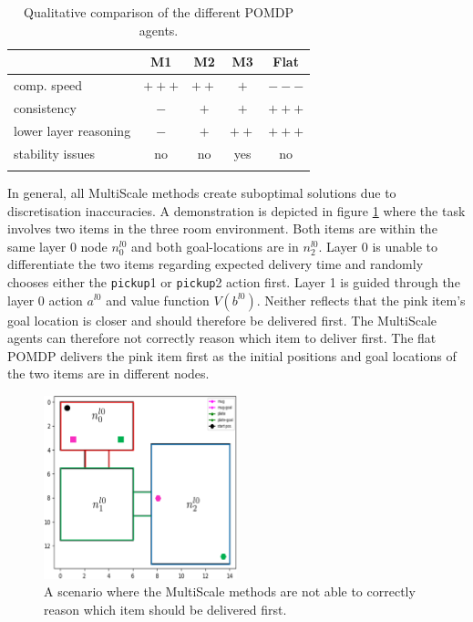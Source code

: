 \begin{table}[h!]
    \centering
    \begin{tabular}{l c c c c}
    \toprule
         &  M1 & M2 & M3 & Flat\\
    \midrule
        \addlinespace
         comp. speed & $+++$ & $++$ & $+$ & $---$ \\
         \addlinespace
         consistency & $-$ & $+$ & $+$ & $+++$ \\
         \addlinespace
         lower layer reasoning & $-$ & $+$ & $++$ & $+++$ \\
         \addlinespace
         stability issues & no & no& yes & no\\
         \addlinespace
    \bottomrule
    \end{tabular}
    \caption{Qualitative comparison of the different POMDP agents.}
    \label{tab:properties}
\end{table}
In general, all MultiScale methods create suboptimal solutions due to discretisation inaccuracies. A demonstration is depicted in figure \ref{fig:suboptimal} where the task involves two items in the three room environment. Both items are within the same layer 0 node $n_0^{l0}$ and both goal-locations are in $n_2^{l0}$. Layer 0 is unable to differentiate the two items regarding expected delivery time and randomly chooses either the \texttt{pickup}1 or \texttt{pickup}2 action first. Layer 1 is guided through the layer 0 action $a^{l0}$ and value function $V(b^{l0})$. Neither reflects that the pink item's goal location is closer and should therefore be delivered first. The MultiScale agents can therefore not correctly reason which item to deliver first. The flat POMDP delivers the pink item first as the initial positions and goal locations of the two items are in different nodes. 
\begin{figure}
    \centering
    \includegraphics[width=0.5\textwidth]{Report/images/suboptimal.png}
    \caption{A scenario where the MultiScale methods are not able to correctly reason which item should be delivered first.}
    \label{fig:suboptimal}
\end{figure}
